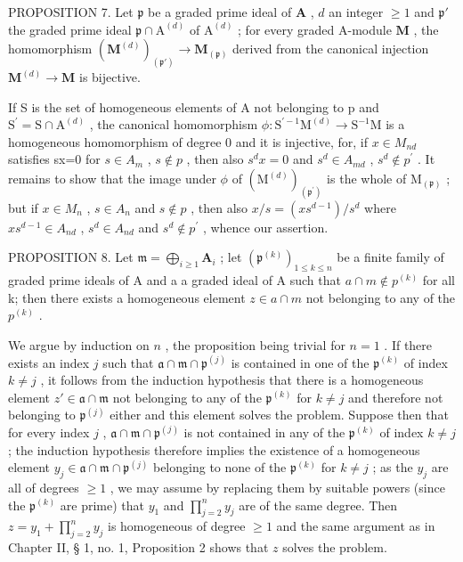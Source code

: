 PROPOSITION 7. Let \(\mathfrak{p}\) be a graded prime ideal of \(\mathbf{A}\) , \(d\) an integer \(\geqslant 1\) and \(\mathfrak{p}'\) the graded prime ideal \(\mathfrak{p} \cap \mathrm{A}^{(d)}\) of \(\mathrm{A}^{(d)}\) ; for every graded A-module \(\mathbf{M}\) , the homomorphism \((\mathbf{M}^{(d)})_{(\mathfrak{p}')} \to \mathbf{M}_{(\mathfrak{p})}\) derived from the canonical injection \(\mathbf{M}^{(d)} \to \mathbf{M}\) is bijective.

If S is the set of homogeneous elements of A not belonging to p and \(\mathrm{S}^{\prime}=\mathrm{S}\cap\mathrm{A}^{(d)}\) , the canonical homomorphism \(\phi:\mathrm{S}^{\prime-1}\mathrm{M}^{(d)}\to\mathrm{S}^{-1}\mathrm{M}\) is a homogeneous homomorphism of degree 0 and it is injective, for, if \(x\in M_{nd}\) satisfies sx=0 for \(s\in A_{m}\) , \(s\notin p\) , then also \(s^{d}x=0\) and \(s^{d}\in A_{md}\) , \(s^{d}\notin p^{\prime}\) . It remains to show that the image under \(\phi\) of \((\mathrm{M}^{(d)})_{(\mathfrak{p}^{\prime})}\) is the whole of \(\mathrm{M}_{(\mathfrak{p})}\) ; but if \(x\in M_{n}\) , \(s\in A_{n}\) and \(s\notin p\) , then also \(x/s=(xs^{d-1})/s^{d}\) where \(xs^{d-1}\in A_{nd}\) , \(s^{d}\in A_{nd}\) and \(s^{d}\notin p^{\prime}\) , whence our assertion.

PROPOSITION 8. Let \(\mathfrak{m} = \bigoplus_{i\geqslant 1}\mathbf{A}_i\) ; let \((\mathfrak{p}^{(k)})_{1\leqslant k\leqslant n}\) be a finite family of graded prime ideals of A and a a graded ideal of A such that \(a \cap m \notin p^{(k)}\) for all k; then there exists a homogeneous element \(z \in a \cap m\) not belonging to any of the \(p^{(k)}\) .

We argue by induction on \(n\) , the proposition being trivial for \(n = 1\) . If there exists an index \(j\) such that \(\mathfrak{a} \cap \mathfrak{m} \cap \mathfrak{p}^{(j)}\) is contained in one of the \(\mathfrak{p}^{(k)}\) of index \(k \neq j\) , it follows from the induction hypothesis that there is a homogeneous element \(z' \in \mathfrak{a} \cap \mathfrak{m}\) not belonging to any of the \(\mathfrak{p}^{(k)}\) for \(k \neq j\) and therefore not belonging to \(\mathfrak{p}^{(j)}\) either and this element solves the problem. Suppose then that for every index \(j\) , \(\mathfrak{a} \cap \mathfrak{m} \cap \mathfrak{p}^{(j)}\) is not contained in any of the \(\mathfrak{p}^{(k)}\) of index \(k \neq j\) ; the induction hypothesis therefore implies the existence of a homogeneous element \(y_j \in \mathfrak{a} \cap \mathfrak{m} \cap \mathfrak{p}^{(j)}\) belonging to none of the \(\mathfrak{p}^{(k)}\) for \(k \neq j\) ; as the \(y_j\) are all of degrees \(\geqslant 1\) , we may assume by replacing them by suitable powers (since the \(\mathfrak{p}^{(k)}\) are prime) that \(y_1\) and \(\prod_{j=2}^{n} y_j\) are of the same degree. Then \(z = y_1 + \prod_{j=2}^{n} y_j\) is homogeneous of degree \(\geqslant 1\) and the same argument as in Chapter II, § 1, no. 1, Proposition 2 shows that \(z\) solves the problem.

